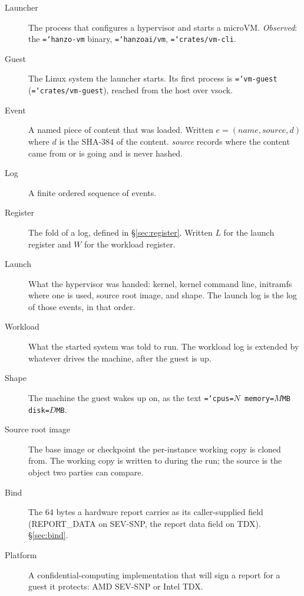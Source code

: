 \documentclass[11pt,a4paper]{article}
\newcommand{\code}[1]{\texttt{\hyphenchar\font=`\-\relax #1}}
\begin{document}
\begin{description}
\item[Launcher] The process that configures a hypervisor and starts a microVM.
  \emph{Observed}: the \code{hanzo-vm} binary, \code{hanzoai/vm},
  \code{crates/vm-cli}.

\item[Guest] The Linux system the launcher starts. Its first process is
  \code{vm-guest} (\code{crates/vm-guest}), reached from the host over vsock.

\item[Event] A named piece of content that was loaded. Written
  $e = (\mathit{name}, \mathit{source}, d)$ where $d$ is the SHA-384 of the
  content. \emph{source} records where the content came from or is going and is
  never hashed.

\item[Log] A finite ordered sequence of events.

\item[Register] The fold of a log, defined in \S\ref{sec:register}. Written $L$
  for the launch register and $W$ for the workload register.

\item[Launch] What the hypervisor was handed: kernel, kernel command line,
  initramfs where one is used, source root image, and shape. The launch log is
  the log of those events, in that order.

\item[Workload] What the started system was told to run. The workload log is
  extended by whatever drives the machine, after the guest is up.

\item[Shape] The machine the guest wakes up on, as the text
  \code{cpus=$N$ memory=$M$MB disk=$D$MB}.

\item[Source root image] The base image or checkpoint the per-instance working
  copy is cloned from. The working copy is written to during the run; the source
  is the object two parties can compare.

\item[Bind] The 64 bytes a hardware report carries as its caller-supplied field
  (REPORT\_DATA on SEV-SNP, the report data field on TDX). \S\ref{sec:bind}.

\item[Platform] A confidential-computing implementation that will sign a report
  for a guest it protects: AMD SEV-SNP or Intel TDX.
\end{description}
\end{document}
